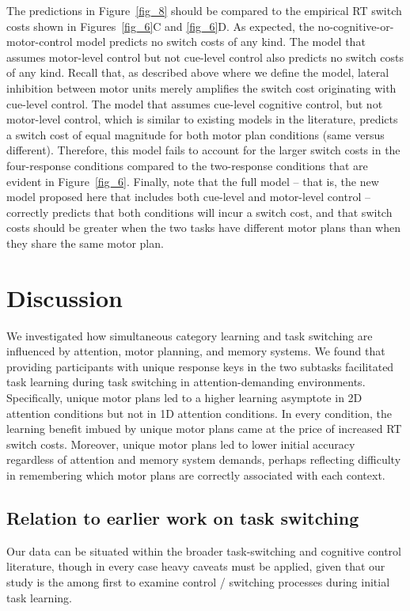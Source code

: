 \documentclass[doc, floatsintext]{apa7}
\begin{document}
The predictions in Figure~\ref{fig_8} should be compared to
the empirical RT switch costs shown in Figures~\ref{fig_6}C
and \ref{fig_6}D.  As expected, the
no-cognitive-or-motor-control model predicts no switch costs
of any kind.  The model that assumes motor-level control but
not cue-level control also predicts no switch costs of any
kind. Recall that, as described above where we define the
model, lateral inhibition between motor units merely
amplifies the switch cost originating with cue-level
control. The model that assumes cue-level cognitive control,
but not motor-level control, which is similar to existing
models in the literature, predicts a switch cost of equal
magnitude for both motor plan conditions (same versus
different).  Therefore, this model fails to account for the
larger switch costs in the four-response conditions compared
to the two-response conditions that are evident in
Figure~\ref{fig_6}.  Finally, note that the full model --
that is, the new model proposed here that includes both
cue-level and motor-level control -- correctly predicts that
both conditions will incur a switch cost, and that switch
costs should be greater when the two tasks have different
motor plans than when they share the same motor plan.

\section{Discussion}
We investigated how simultaneous category learning and task
switching are influenced by attention, motor planning, and
memory systems. We found that providing participants with
unique response keys in the two subtasks facilitated task
learning during task switching in attention-demanding
environments. Specifically, unique motor plans led to a
higher learning asymptote in 2D attention conditions but not
in 1D attention conditions. In every condition, the learning
benefit imbued by unique motor plans came at the price of
increased RT switch costs. Moreover, unique motor plans led
to lower initial accuracy regardless of attention and memory
system demands, perhaps reflecting difficulty in remembering
which motor plans are correctly associated with each
context.

\subsection{Relation to earlier work on task switching}
Our data can be situated within the broader task-switching
and cognitive control literature, though in every case heavy
caveats must be applied, given that our study is the among
first to examine control / switching processes during
initial task learning.
\end{document}
